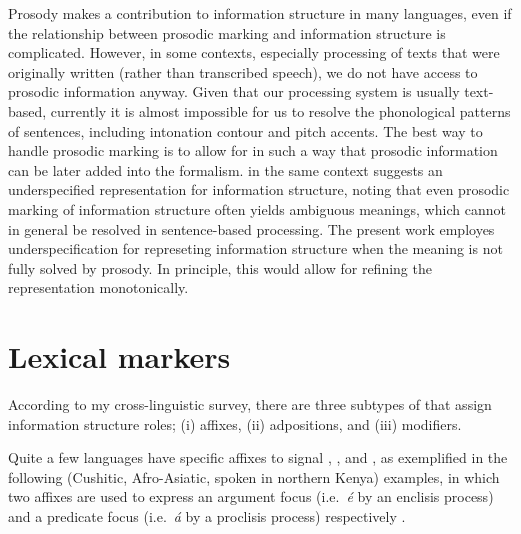 Prosody makes a contribution to information structure in many
languages, even if the relationship between prosodic
marking and information structure is complicated. However, in some
contexts, especially processing of texts that were originally written
(rather than transcribed speech), we do not have access to prosodic
information anyway.  Given that our processing system is usually
text-based, currently it is almost impossible for us to resolve the
phonological patterns of sentences, including intonation contour and
pitch accents.  The best way to handle prosodic marking is to allow
for  in such a way that prosodic information
can be later added into the formalism.  \citet{kuhn:96} in the same
context suggests an underspecified representation for information
structure, noting that even prosodic marking of information structure
often yields ambiguous meanings, which cannot in general be resolved
in sentence-based processing.  The present work employes
underspecification for represeting information structure when the
meaning is not fully solved by prosody. In
principle, this would allow for refining the representation
monotonically.



\section{Lexical markers}
\label{4:sec:lexical}


According to my cross-linguistic survey, there are three subtypes of
 that assign information structure roles; (i) affixes,
(ii) adpositions, and (iii) modifiers.

Quite a few languages have specific affixes to signal , ,
and , as exemplified in the following  (Cushitic,
Afro-Asiatic, spoken in northern Kenya) examples, in which two affixes
are used to express an argument focus (i.e.\ \textit{{\'e}} by an
enclisis process) and a predicate focus (i.e.\ \textit{{\'a}} by a
proclisis process) respectively \citep{lecarme:99}.




